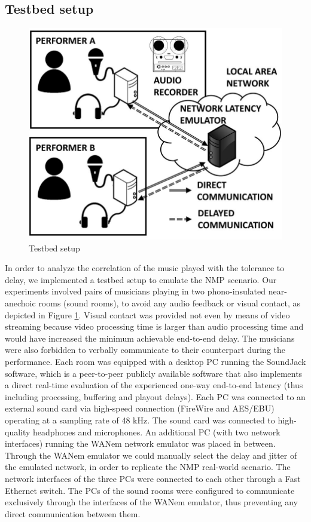 \subsection{Testbed setup}\label{sec:NMP:testbed}
\begin{figure}[!tb]
  \centering
  \includegraphics[width=.95\textwidth]{img/NMP/setup}
  \caption{Testbed setup}
 \label{fig:NMP:testbed}
\end{figure}
In order to analyze the correlation of the music played with the tolerance to delay, we implemented a testbed setup to emulate the NMP scenario. Our experiments involved pairs of musicians playing in two phono-insulated near-anechoic rooms (sound rooms), to avoid any audio feedback or visual contact, as depicted in Figure \ref{fig:NMP:testbed}. Visual contact was provided not even by means of video streaming because video processing time is larger than audio processing time and would have increased the minimum achievable end-to-end delay. The musicians were also forbidden to verbally communicate to their counterpart during the performance. Each room was equipped with a desktop PC running the SoundJack software, which is a peer-to-peer publicly available software \cite{carot2008distributed} that also implements a direct real-time evaluation of the experienced one-way end-to-end latency (thus including processing, buffering and playout delays).  Each PC was connected to an external sound card via high-speed connection (FireWire and AES/EBU) operating at a sampling rate of 48 kHz. The sound card was connected to high-quality headphones and microphones. An additional PC (with two network interfaces) running the WANem network emulator \cite{wanem} was placed in between. 
Through the WANem emulator we could manually select the delay and jitter of the emulated network, in order to replicate the NMP real-world scenario. The network interfaces of the three PCs were connected to each other through a Fast Ethernet switch. The PCs of the sound rooms were configured to communicate exclusively through the interfaces of the WANem emulator, thus preventing any direct communication between them. 

